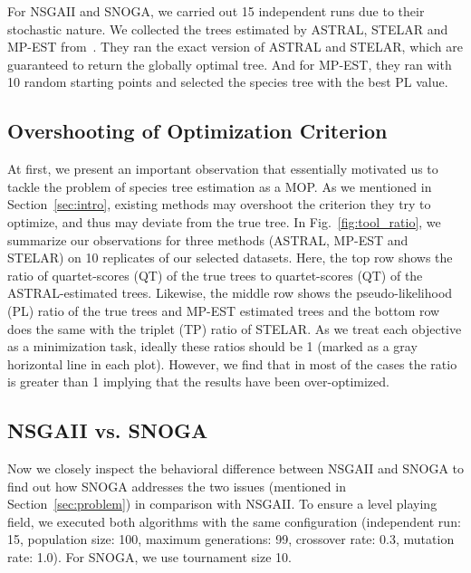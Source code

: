 For NSGAII and SNOGA, we carried out 15 independent runs due to their stochastic nature. We collected the trees estimated by ASTRAL, STELAR and MP-EST from~\cite{islam2019stelar}. They ran the exact version of ASTRAL and STELAR, which are guaranteed to return the globally optimal tree. And for MP-EST, they ran with 10 random starting points and selected the species tree with the best PL value.   



\subsection{Overshooting of Optimization Criterion}
\label{subsec:observation}
At first, we present an important observation that essentially motivated us to tackle the problem of species tree estimation as a MOP. As we mentioned in Section~\ref{sec:intro}, existing methods may overshoot the criterion they try to optimize, and thus may deviate from the true tree. In Fig.~\ref{fig:tool_ratio}, we summarize our observations for three methods (ASTRAL, MP-EST and STELAR) on 10 replicates of our selected datasets. Here, the top row shows the ratio of quartet-scores (QT) of the true trees to quartet-scores (QT) of the ASTRAL-estimated trees. Likewise, the middle row shows the pseudo-likelihood (PL) ratio of the true trees and MP-EST estimated trees and the bottom row does the same with the triplet (TP) ratio of STELAR. As we treat each objective as a minimization task, ideally these ratios should be 1 (marked as a gray horizontal line in each plot). However, we find that in most of the cases the ratio is greater than 1 implying that the results have been over-optimized. %


\subsection{NSGAII vs. SNOGA}
Now we closely inspect the behavioral difference between NSGAII and SNOGA to find out how SNOGA addresses the two issues (mentioned in Section~\ref{sec:problem}) in comparison with NSGAII. To ensure a level playing field, we executed both algorithms with the same configuration (independent run: 15, population size: 100, maximum generations: 99, crossover rate: 0.3, mutation rate: 1.0). For SNOGA, we use tournament size 10.


